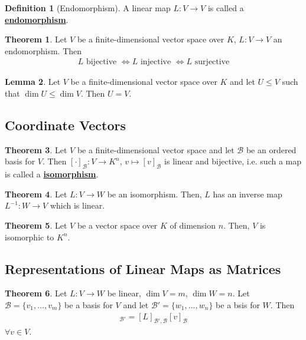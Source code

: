\documentclass[11pt]{scrartcl}
\theoremstyle{definition}
\newtheorem{theorem}{Theorem}
\newtheorem{lemma}[theorem]{Lemma}
\newtheorem{definition}{Definition}
\theoremstyle{remark}
\newcommand{\dfn}[1]{\textbf{\underline{#1}}}
\begin{document}
\begin{definition}[Endomorphism]
	A linear map $L: V \rightarrow V$ is called a \dfn{endomorphism}. 
\end{definition}

\begin{theorem}
	Let $V$ be a finite-dimensional vector space over $K$, $L: V \rightarrow V$ an endomorphism. Then 
	\begin{align}
		L \text{ bijective } \iff L \text{ injective } \iff L \text{ surjective} 	
	\end{align}
\end{theorem}

\begin{lemma}
	Let $V$ be a finite-dimensional vector space over $K$ and let $U \leq V$ such that $\dim U \leq \dim V$. Then $U=V$.
\end{lemma}

\subsection{Coordinate Vectors}
\begin{theorem}
	Let $V$ be a finite-dimensional vector space and let $\mathcal{B}$ be an ordered basis for $V$. Then $[ \cdot ]_{\mathcal{B}}: V \rightarrow K^n$, $v \mapsto [v]_{\mathcal{B}}$ is linear and bijective, i.e. such a map is called a \dfn{isomorphism}. 
\end{theorem}


\begin{theorem}
	Let $L: V \rightarrow W$ be an isomorphism. Then, $L$ has an inverse map $L^{-1}: W \rightarrow V$ which is linear. 
\end{theorem}

\begin{theorem}
	Let $V$ be a vector space over $K$ of dimension $n$. Then, $V$ is isomorphic to $K^n$. 
\end{theorem}


\subsection{Representations of Linear Maps as Matrices}
\begin{theorem}
	Let $L: V \rightarrow W$ be linear, $\dim V = m$, $\dim W = n$. Let $\mathcal{B} = \{ v_1, ..., v_m \}$ be a basis for $V$ and let $\mathcal{B'} = \{ w_1, ..., w_n \}$ be a bsis for $W$. Then
	\begin{align}
		[ L(v) ]_{\mathcal{B}'} = [L]_{\mathcal{B'}, \mathcal{B}} [v]_{\mathcal{B}} 	
	\end{align}
	$\forall v \in V$.
\end{theorem}
\end{document}

